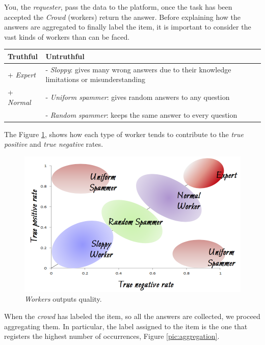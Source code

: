 You, the \emph{requester}, pass the data to the platform, once the task has been accepted the \emph{Crowd} (workers) return the answer. Before explaining how the answers are aggregated to finally label the item, it is important to consider the vast kinds of workers than can be faced.

\begin{center} %
\begin{tabular} {| p{5 cm} | p{5 cm} |}
\hline
\bf Truthful & \bf Untruthful \\ \hline
+ \emph{Expert} & - \emph{Sloppy}: gives many wrong answers due to their knowledge limitations or misunderstanding  \\
+ \emph{Normal}  & - \emph{Uniform spammer}: gives random answers to any question \\
& - \emph{Random spammer}: keeps the same answer to every question \\
\hline
\end{tabular}
\end{center}


The Figure \ref{pic:worker_crowdsourcing}, shows how each type of worker tends to contribute to the \emph{true positive} and \emph{true negative}  rates.

\begin{figure}[H]%
 \centering
 \includegraphics[width=13cm]{./img/08/worker_crowdsourcing}
 \caption{\label{pic:worker_crowdsourcing} \emph{Workers} outputs quality.}
\end{figure}

When the \emph{crowd} has labeled the item, so all the answers are collected, we proceed aggregating them. In particular, the label assigned to the item is the one that registers the highest number of occurrences, Figure \ref{pic:aggregation}.

